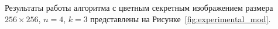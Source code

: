 \documentclass[a4paper,article,14pt]{extarticle}
\begin{document}
Результаты работы алгоритма с цветным секретным изображением размера $256\times256$, $n=4$, $k=3$ представлены на Рисунке~\ref{fig:experimental_mod}.

\begin{figure}[ph!]
    \begin{minipage}[h]{0.3\linewidth}
    \end{minipage}
    \hfill
    \begin{minipage}[h]{0.3\linewidth}

\end{minipage}
\end{figure}
\end{document}
